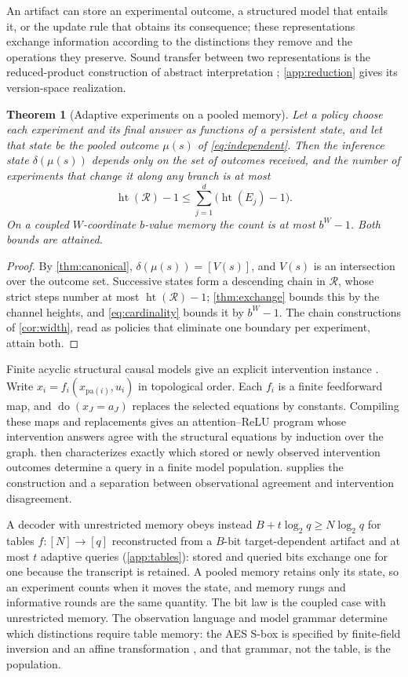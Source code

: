 \documentclass{article}
\newtheorem{theorem}{Theorem}
\theoremstyle{definition}
\newcommand{\R}{\mathcal R}
\newcommand{\height}{\operatorname{ht}}
\newcommand{\doop}{\operatorname{do}}
\begin{document}
An artifact can store an experimental outcome, a structured model that entails it, or the update rule that obtains its consequence; these representations exchange information according to the distinctions they remove and the operations they preserve. Sound transfer between two representations is the reduced-product construction of abstract interpretation \citep{cousot1979}; \cref{app:reduction} gives its version-space realization.

\begin{theorem}[Adaptive experiments on a pooled memory]\label{thm:policy}
Let a policy choose each experiment and its final answer as functions of a persistent state, and let that state be the pooled outcome $\mu(s)$ of \eqref{eq:independent}. Then the inference state $\delta(\mu(s))$ depends only on the set of outcomes received, and the number of experiments that change it along any branch is at most
\begin{equation}
 \height(\R)-1\le\sum_{j=1}^d\bigl(\height(E_j)-1\bigr).\label{eq:policy}
\end{equation}
On a coupled $W$-coordinate $b$-value memory the count is at most $b^W-1$. Both bounds are attained.
\end{theorem}
\begin{proof}
By \cref{thm:canonical}, $\delta(\mu(s))=[V(s)]$, and $V(s)$ is an intersection over the outcome set. Successive states form a descending chain in $\R$, whose strict steps number at most $\height(\R)-1$; \cref{thm:exchange} bounds this by the channel heights, and \eqref{eq:cardinality} bounds it by $b^W-1$. The chain constructions of \cref{cor:width}, read as policies that eliminate one boundary per experiment, attain both.
\end{proof}

Finite acyclic structural causal models give an explicit intervention instance \citep{pearl2009}. Write $x_i=f_i(x_{\mathrm{pa}(i)},u_i)$ in topological order. Each $f_i$ is a finite feedforward map, and $\doop(x_J=a_J)$ replaces the selected equations by constants. Compiling these maps and replacements gives an attention--ReLU program whose intervention answers agree with the structural equations by induction over the graph.  then characterizes exactly which stored or newly observed intervention outcomes determine a query in a finite model population.  supplies the construction and a separation between observational agreement and intervention disagreement.

A decoder with unrestricted memory obeys instead $B+t\log_2q\ge N\log_2q$ for tables $f:[N]\to[q]$ reconstructed from a $B$-bit target-dependent artifact and at most $t$ adaptive queries (\cref{app:tables}): stored and queried bits exchange one for one because the transcript is retained. A pooled memory retains only its state, so an experiment counts when it moves the state, and memory rungs and informative rounds are the same quantity. The bit law is the coupled case with unrestricted memory. The observation language and model grammar determine which distinctions require table memory: the AES S-box is specified by finite-field inversion and an affine transformation \citep{nist2023aes}, and that grammar, not the table, is the population.
\end{document}
